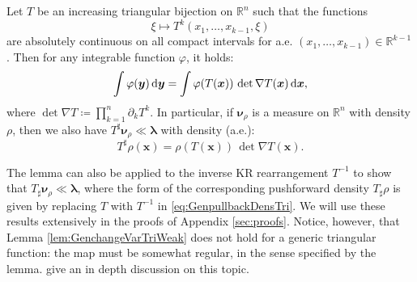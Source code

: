 \documentclass[twoside,11pt]{article}
\newcommand{\push}{_\sharp}                                      %
\newcommand{\lebm}{\boldsymbol{\lambda} } %
\newcommand{\genm}{\boldsymbol{\nu} }   %
\newcommand{\re}{\mathbb{R}}
\newcommand{\xb}{\boldsymbol{x}}
\newcommand{\yb}{\boldsymbol{y}}
\newcommand{\pull}{^\sharp}
\begin{document}
 
\begin{lemma} \label{lem:GenchangeVarTriWeak}
Let $T$ be an increasing triangular bijection on $\re^n$ such that the functions
\begin{equation}  
  \xi \mapsto T^k( x_1 ,\ldots, x_{k-1}, \xi )
\end{equation}
are absolutely continuous on all compact intervals for a.e.
$(x_1,\ldots,x_{k-1})\in \re^{k-1}$. %
Then for any 
%
integrable function $\varphi$, it holds:
\begin{equation}
  \int \varphi(\yb)\,{\rm d}\yb =
  \int \varphi(T(\xb))\,\det \nabla T(\xb)\,{\rm d}\xb, 
\end{equation}
where $\det \nabla T \coloneqq \prod_{k=1}^n \partial_k T^k$.
In particular, if %
$\genm_{\rho}$ is a measure on $\re^n$ with density $\rho$,  then
%
we also have
$T \pull \genm_{\rho} \ll \lebm$ with density (a.e.): %
\begin{equation} \label{eq:GenpullbackDensTri}
  T\pull \rho(\xb) = \rho(T(\xb))\,\det \nabla T(\xb).
\end{equation}
%
%
%
\end{lemma}
%
The lemma can also be applied to the inverse KR rearrangement $T^{-1}$ to show that
$T \push \genm_{\rho} \ll \lebm$, where
the form of the corresponding
pushforward density $T\push \rho$ is given by  replacing $T$
with $T^{-1}$ in \eqref{eq:GenpullbackDensTri}. 
%
We will use these results extensively in the proofs of Appendix \ref{sec:proofs}.
Notice, however, that Lemma \ref{lem:GenchangeVarTriWeak} does not hold for
a generic triangular function: the map must be somewhat regular, in the sense
specified by the lemma. 
\citet{bogachev2005triangular} give an in depth discussion on this topic.
\end{document}
